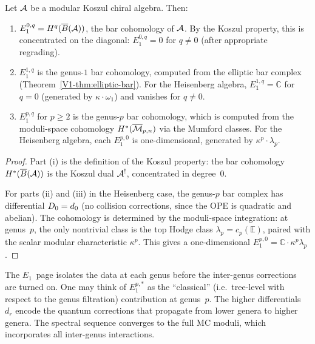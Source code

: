 \begin{proposition}
Let $\mathcal{A}$ be a modular Koszul chiral algebra. Then:
\begin{enumerate}[label=\textup{(\roman*)}]
\item $E_1^{0,q} = H^q(\overline{B}(\mathcal{A}))$, the bar cohomology of
 $\mathcal{A}$. By the Koszul property, this is concentrated on the
 diagonal: $E_1^{0,q} = 0$ for $q \neq 0$ (after appropriate
 regrading).
\item $E_1^{1,q}$ is the genus-$1$ bar cohomology, computed
 from the elliptic bar complex
 (Theorem~\ref{V1-thm:elliptic-bar}). For the Heisenberg
 algebra, $E_1^{1,q} = \mathbb{C}$ for $q = 0$ (generated by
 $\kappa \cdot \omega_1$) and vanishes for $q \neq 0$.
\item $E_1^{p,q}$ for $p \geq 2$ is the genus-$p$ bar
 cohomology, which is computed from the moduli-space
 cohomology $H^*(\overline{\mathcal{M}}_{p,n})$ via the Mumford
 classes. For the Heisenberg algebra, each $E_1^{p,0}$ is
 one-dimensional, generated by $\kappa^p \cdot \lambda_p$.
\end{enumerate}
\end{proposition}

\begin{proof}
Part (i) is the definition of the Koszul property: the bar
cohomology $H^*(\overline{B}(\mathcal{A}))$ is the Koszul dual $\mathcal{A}^!$,
concentrated in degree~$0$.

For parts (ii) and (iii) in the Heisenberg case, the genus-$p$
bar complex has differential $D_0 = d_0$ (no collision
corrections, since the OPE is quadratic and abelian). The
cohomology is determined by the moduli-space integration:
at genus~$p$, the only nontrivial class is the top Hodge class
$\lambda_p = c_p(\mathbb{E})$, paired with the scalar modular
characteristic $\kappa^p$. This gives a one-dimensional
$E_1^{p,0} = \mathbb{C} \cdot \kappa^p \lambda_p$.
\end{proof}

\begin{remark}
The $E_1$~page isolates the data at each genus before the
inter-genus corrections are turned on. One may think of
$E_1^{p,*}$ as the ``classical'' (i.e.\ tree-level with respect
to the genus filtration) contribution at genus~$p$. The
higher differentials $d_r$ encode the quantum corrections that
propagate from lower genera to higher genera. The spectral
sequence converges to the full MC moduli, which incorporates
all inter-genus interactions.
\end{remark}

